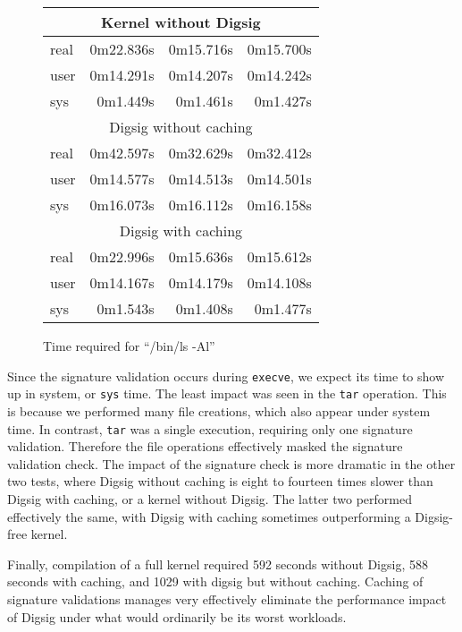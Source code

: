\documentclass{article}
\begin{document}
\begin{figure}
\begin{center}
\begin{tabular}{|l|r|r|r|}
\hline
\multicolumn{4}{|c|}{Kernel without Digsig} \\
\hline
	real   & 0m22.836s& 0m15.716s &0m15.700s \\
	user   & 0m14.291s& 0m14.207s &0m14.242s \\
	sys    & 0m1.449s &0m1.461s &0m1.427s \\
\hline
\multicolumn{4}{|c|}{Digsig without caching} \\
\hline
	real   & 0m42.597s& 0m32.629s &0m32.412s \\
	user   & 0m14.577s& 0m14.513s &0m14.501s \\
	sys    & 0m16.073s& 0m16.112s &0m16.158s \\
\hline
\multicolumn{4}{|c|}{Digsig with caching} \\
\hline
	real   & 0m22.996s& 0m15.636s &0m15.612s \\
	user   & 0m14.167s& 0m14.179s &0m14.108s \\
	sys    & 0m1.543s &0m1.408s   & 0m1.477s \\
\hline
\end{tabular}
\caption{Time required for ``/bin/ls -Al''}\label{fig:comptimings}
\end{center}
\end{figure}

Since the signature validation occurs during {\tt execve}, we expect its
time to show up in system, or {\tt sys} time.
The least impact was seen in the {\tt tar} operation.  This is because
we performed many file creations, which also appear under system time.
In contrast, {\tt tar} was a single execution, requiring only one signature
validation.  Therefore the file operations effectively masked the signature
validation check.  The
impact of the signature check is more dramatic in the other two tests,
where Digsig without caching is eight to fourteen times slower than
Digsig with caching, or a kernel without Digsig.  The latter two
performed effectively the same, with Digsig with caching sometimes
outperforming a Digsig-free kernel.

Finally, compilation of a full kernel required 592 seconds without
Digsig, 588 seconds with caching, and 1029 with digsig but without caching.
Caching of signature validations manages very effectively
eliminate the performance impact of Digsig under what would ordinarily
be its worst workloads.
\end{document}
